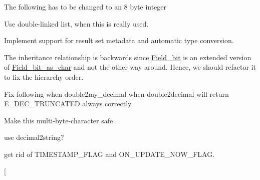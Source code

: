 \begin{DoxyRefList}
The following has to be changed to an 8 byte integer 
\item[\label{todo__todo000111}%
\Hypertarget{todo__todo000111}%
Member \mbox{\hyperlink{classEd__connection_ad80317ac21aa245c7a0d1162ac98b264}{Ed\+\_\+connection\+:\+:store\+\_\+result\+\_\+set}} ()]Use double-\/linked list, when this is really used. 
\item[\label{todo__todo000113}%
\Hypertarget{todo__todo000113}%
Class \mbox{\hyperlink{classEd__result__set}{Ed\+\_\+result\+\_\+set}} ]Implement support for result set metadata and automatic type conversion.  
\item[\label{todo__todo000013}%
\Hypertarget{todo__todo000013}%
Class \mbox{\hyperlink{classField__bit__as__char}{Field\+\_\+bit\+\_\+as\+\_\+char}} ]The inheritance relationship is backwards since \mbox{\hyperlink{classField__bit}{Field\+\_\+bit}} is an extended version of \mbox{\hyperlink{classField__bit__as__char}{Field\+\_\+bit\+\_\+as\+\_\+char}} and not the other way around. Hence, we should refactor it to fix the hierarchy order.  
\item[\label{todo__todo000012}%
\Hypertarget{todo__todo000012}%
Member \mbox{\hyperlink{classField__new__decimal_a05d9f15a2a8a5148871c947dfe7a9dbe}{Field\+\_\+new\+\_\+decimal\+:\+:store}} (double nr)]Fix following when double2my\+\_\+decimal when double2decimal will return E\+\_\+\+D\+E\+C\+\_\+\+T\+R\+U\+N\+C\+A\+T\+ED always correctly  
\item[\label{todo__todo000010}%
\Hypertarget{todo__todo000010}%
Member \mbox{\hyperlink{classField__num_a6497614b428534475736dc71902096fd}{Field\+\_\+num\+:\+:check\+\_\+int}} (const C\+H\+A\+R\+S\+E\+T\+\_\+\+I\+N\+FO $\ast$cs, const char $\ast$str, size\+\_\+t length, const char $\ast$int\+\_\+end, int error)]Make this multi-\/byte-\/character safe 
\item[\label{todo__todo000011}%
\Hypertarget{todo__todo000011}%
Member \mbox{\hyperlink{classField__str_ae0a260a3e657aa6778dcf651ff3e9b95}{Field\+\_\+str\+:\+:store\+\_\+decimal}} (const \mbox{\hyperlink{classmy__decimal}{my\+\_\+decimal}} $\ast$)]use decimal2string? 
\item[\label{todo__todo000014}%
\Hypertarget{todo__todo000014}%
Member \mbox{\hyperlink{classField__temporal__with__date__and__time_ac497834ddc1ef395a387790d97cfb63d}{Field\+\_\+temporal\+\_\+with\+\_\+date\+\_\+and\+\_\+time\+:\+:init\+\_\+timestamp\+\_\+flags}} ()]get rid of T\+I\+M\+E\+S\+T\+A\+M\+P\+\_\+\+F\+L\+AG and O\+N\+\_\+\+U\+P\+D\+A\+T\+E\+\_\+\+N\+O\+W\+\_\+\+F\+L\+AG.  
\item[\label{todo__todo000015}%

\end{DoxyRefList}
